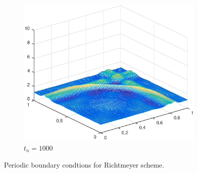 \begin{figure}[h!]
\begin{subfigure}[t]{0.48\textwidth}
        \includegraphics[width=\textwidth]{images/sol_ri_1000_per.eps}
        \caption{$t_{n}=1000$}
        \label{fig:100}
    \end{subfigure}
    \caption{Periodic boundary condtions for Richtmeyer scheme.}
    \label{fig:2DSolutions_ri}
\end{figure}
